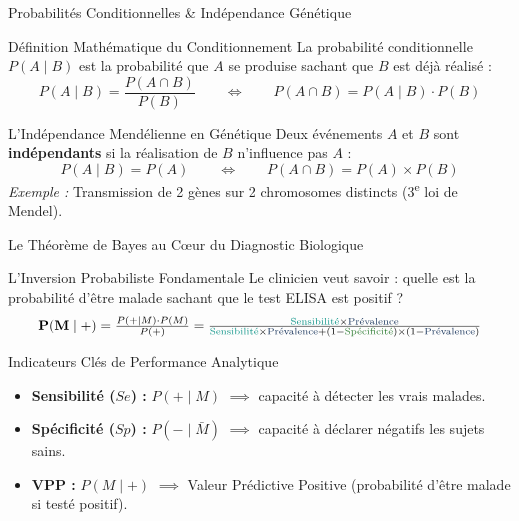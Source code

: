 \documentclass[aspectratio=169,10pt]{beamer}
\begin{document}
\begin{frame}{Probabilités Conditionnelles \& Indépendance Génétique}
  \begin{conceptbox}{Définition Mathématique du Conditionnement}
    La probabilité conditionnelle $P(A \mid B)$ est la probabilité que $A$ se produise sachant que $B$ est déjà réalisé :
    \begin{equation*}
      P(A \mid B) = \frac{P(A \cap B)}{P(B)} \qquad \iff \qquad P(A \cap B) = P(A \mid B) \cdot P(B)
    \end{equation*}
  \end{conceptbox}
  \vspace{1.5mm}
  \begin{biobox}{L'Indépendance Mendélienne en Génétique}
    Deux événements $A$ et $B$ sont \textbf{indépendants} si la réalisation de $B$ n'influence pas $A$ :
    \begin{equation*}
      P(A \mid B) = P(A) \qquad \iff \qquad P(A \cap B) = P(A) \times P(B)
    \end{equation*}
    \textit{Exemple :} Transmission de 2 gènes sur 2 chromosomes distincts (3\textsuperscript{e} loi de Mendel).
  \end{biobox}
\end{frame}

\begin{frame}{Le Théorème de Bayes au Cœur du Diagnostic Biologique}
  \begin{conceptbox}{L'Inversion Probabiliste Fondamentale}
    Le clinicien veut savoir : quelle est la probabilité d'être malade sachant que le test ELISA est positif ?
    \begin{equation*}
      \resizebox{0.92\linewidth}{!}{$\mathbf{P(M \mid +)} = \frac{P(+ \mid M) \cdot P(M)}{P(+)} = \frac{\text{\color{BioTeal}Sensibilité} \times \text{\color{BioNavy}Prévalence}}{\text{\color{BioTeal}Sensibilité} \times \text{\color{BioNavy}Prévalence} + (1 - \text{\color{BioGreen}Spécificité}) \times (1 - \text{\color{BioNavy}Prévalence})}$}
    \end{equation*}
  \end{conceptbox}
  \vspace{1.5mm}
  \begin{biobox}{Indicateurs Clés de Performance Analytique}
    \begin{itemize}\setlength{\itemsep}{1.5pt}
      \item \textbf{Sensibilité ($Se$) :} $P(+ \mid M)$ $\implies$ capacité à détecter les vrais malades.
      \item \textbf{Spécificité ($Sp$) :} $P(- \mid \bar{M})$ $\implies$ capacité à déclarer négatifs les sujets sains.
      \item \textbf{VPP :} $P(M \mid +)$ $\implies$ Valeur Prédictive Positive (probabilité d'être malade si testé positif).
    \end{itemize}
  \end{biobox}
\end{frame}
\end{document}
